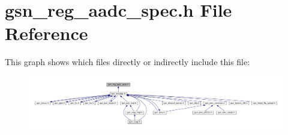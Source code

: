 \hypertarget{a00543}{
\section{gsn\_\-reg\_\-aadc\_\-spec.h File Reference}
\label{a00543}
}
This graph shows which files directly or indirectly include this file:
\nopagebreak
\begin{figure}[H]
\begin{center}
\leavevmode
\includegraphics[width=400pt]{a00782}
\end{center}
\end{figure}
